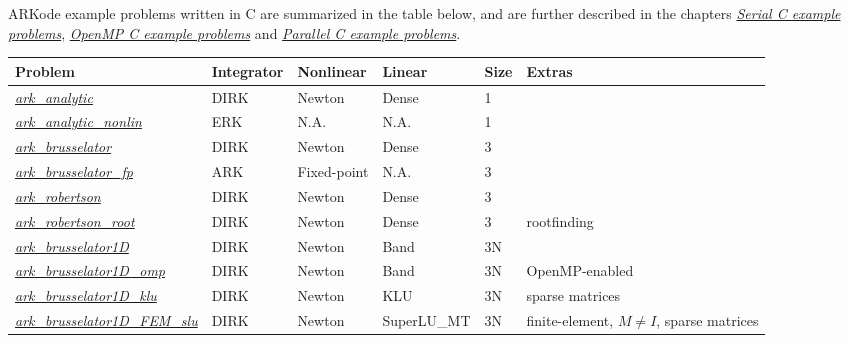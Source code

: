 \documentclass[letterpaper,10pt,english]{sphinxmanual}
\begin{document}
ARKode example problems written in C are summarized in the table
below, and are further described in the chapters {\hyperref[c_serial:serial-c]{\emph{Serial C example problems}}},
{\hyperref[c_openmp:openmp-c]{\emph{OpenMP C example problems}}} and {\hyperref[c_parallel:parallel-c]{\emph{Parallel C example problems}}}.

\begin{tabulary}{\linewidth}{|L|L|L|L|L|L|}
\hline
\textbf{\relax 
Problem
} & \textbf{\relax 
Integrator
} & \textbf{\relax 
Nonlinear
} & \textbf{\relax 
Linear
} & \textbf{\relax 
Size
} & \textbf{\relax 
Extras
}\\\hline

{\hyperref[c_serial:ark-analytic]{\emph{ark\_analytic}}}
 & 
DIRK
 & 
Newton
 & 
Dense
 & 
1
 & \\\hline

{\hyperref[c_serial:ark-analytic-nonlin]{\emph{ark\_analytic\_nonlin}}}
 & 
ERK
 & 
N.A.
 & 
N.A.
 & 
1
 & \\\hline

{\hyperref[c_serial:ark-brusselator]{\emph{ark\_brusselator}}}
 & 
DIRK
 & 
Newton
 & 
Dense
 & 
3
 & \\\hline

{\hyperref[c_serial:ark-brusselator-fp]{\emph{ark\_brusselator\_fp}}}
 & 
ARK
 & 
Fixed-point
 & 
N.A.
 & 
3
 & \\\hline

{\hyperref[c_serial:ark-robertson]{\emph{ark\_robertson}}}
 & 
DIRK
 & 
Newton
 & 
Dense
 & 
3
 & \\\hline

{\hyperref[c_serial:ark-robertson-root]{\emph{ark\_robertson\_root}}}
 & 
DIRK
 & 
Newton
 & 
Dense
 & 
3
 & 
rootfinding
\\\hline

{\hyperref[c_serial:ark-brusselator1d]{\emph{ark\_brusselator1D}}}
 & 
DIRK
 & 
Newton
 & 
Band
 & 
3N
 & \\\hline

{\hyperref[c_openmp:ark-brusselator1d-omp]{\emph{ark\_brusselator1D\_omp}}}
 & 
DIRK
 & 
Newton
 & 
Band
 & 
3N
 & 
OpenMP-enabled
\\\hline

{\hyperref[c_serial:ark-brusselator1d-klu]{\emph{ark\_brusselator1D\_klu}}}
 & 
DIRK
 & 
Newton
 & 
KLU
 & 
3N
 & 
sparse matrices
\\\hline

{\hyperref[c_serial:ark-brusselator1d-fem-slu]{\emph{ark\_brusselator1D\_FEM\_slu}}}
 & 
DIRK
 & 
Newton
 & 
SuperLU\_MT
 & 
3N
 & 
finite-element, $M\ne I$, sparse matrices
\\\hline


\end{tabulary}
\end{document}
